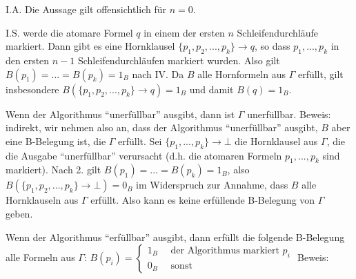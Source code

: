 \documentclass[a4paper]{article}
\begin{document}
\begin{multicols}{3}
  \begin{itemize*}
    \itemsep1pt\parskip0pt
    \item
          I.A. Die Aussage gilt offensichtlich für $n=0$.
    \item
          I.S. werde die atomare Formel $q$ in einem der ersten $n$
          Schleifendurchläufe markiert. Dann gibt es eine Hornklausel
          $\{p_1,p_2 ,... ,p_k\}\rightarrow q$, so dass $p_1 ,... ,p_k$ in den
          ersten $n-1$ Schleifendurchläufen markiert wurden. Also gilt
          $B(p_1)=...=B(p_k) = 1_B$ nach IV. Da $B$ alle Hornformeln aus
          $\Gamma$ erfüllt, gilt insbesondere
          $B(\{p_1 ,p_2 ,... ,p_k\}\rightarrow q) = 1_B$ und damit $B(q) = 1_B$.
  \end{itemize*}

  \begin{enumerate*}
    \setcounter{enumi}{2}
    \itemsep1pt\parskip0pt
    \item
          Wenn der Algorithmus ``unerfüllbar'' ausgibt, dann ist $\Gamma$
          unerfüllbar. Beweis: indirekt, wir nehmen also an, dass der
          Algorithmus ``unerfüllbar'' ausgibt, $B$ aber eine B-Belegung ist, die
          $\Gamma$ erfüllt. Sei $\{p_1 ,... ,p_k\}\rightarrow\bot$ die
          Hornklausel aus $\Gamma$, die die Ausgabe ``unerfüllbar'' verursacht
          (d.h. die atomaren Formeln $p_1 ,... ,p_k$ sind markiert). Nach 2.
          gilt $B(p_1) =...=B(p_k) = 1_B$, also
          $B(\{p_1 ,p_2 ,... ,p_k\}\rightarrow\bot) = 0_B$ im Widerspruch zur
          Annahme, dass $B$ alle Hornklauseln aus $\Gamma$ erfüllt. Also kann es
          keine erfüllende B-Belegung von $\Gamma$ geben.
    \item
          Wenn der Algorithmus ``erfüllbar'' ausgibt, dann erfüllt die folgende
          B-Belegung alle Formeln aus $\Gamma$:
          $B(p_i)=\begin{cases} 1_B \quad\text{ der Algorithmus markiert } p_i \\ 0_B \quad\text{ sonst} \end{cases}$
          Beweis:


\end{enumerate*}
\end{multicols}
\end{document}
